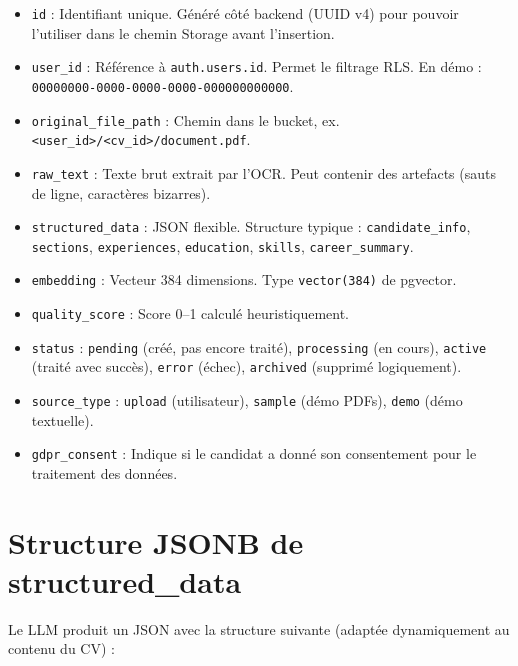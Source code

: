 \documentclass[11pt,a4paper]{report}
\begin{document}
\begin{itemize}[leftmargin=*]
  \item \texttt{id} : Identifiant unique. Généré côté backend (UUID v4) pour pouvoir l'utiliser dans le chemin Storage avant l'insertion.
  \item \texttt{user\_id} : Référence à \texttt{auth.users.id}. Permet le filtrage RLS. En démo : \texttt{00000000-0000-0000-0000-000000000000}.
  \item \texttt{original\_file\_path} : Chemin dans le bucket, ex. \texttt{<user\_id>/<cv\_id>/document.pdf}.
  \item \texttt{raw\_text} : Texte brut extrait par l'OCR. Peut contenir des artefacts (sauts de ligne, caractères bizarres).
  \item \texttt{structured\_data} : JSON flexible. Structure typique : \texttt{candidate\_info}, \texttt{sections}, \texttt{experiences}, \texttt{education}, \texttt{skills}, \texttt{career\_summary}.
  \item \texttt{embedding} : Vecteur 384 dimensions. Type \texttt{vector(384)} de pgvector.
  \item \texttt{quality\_score} : Score 0–1 calculé heuristiquement.
  \item \texttt{status} : \texttt{pending} (créé, pas encore traité), \texttt{processing} (en cours), \texttt{active} (traité avec succès), \texttt{error} (échec), \texttt{archived} (supprimé logiquement).
  \item \texttt{source\_type} : \texttt{upload} (utilisateur), \texttt{sample} (démo PDFs), \texttt{demo} (démo textuelle).
  \item \texttt{gdpr\_consent} : Indique si le candidat a donné son consentement pour le traitement des données.
\end{itemize}

\section{Structure JSONB de structured\_data}

Le LLM produit un JSON avec la structure suivante (adaptée dynamiquement au contenu du CV) :
\end{document}
